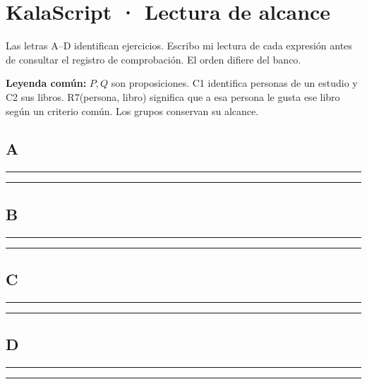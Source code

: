 \documentclass[11pt,a4paper]{article}
\begin{document}
\section*{KalaScript · Lectura de alcance}
Las letras A--D identifican ejercicios. Escribo mi lectura de cada expresión
antes de consultar el registro de comprobación. El orden difiere del banco.
\par\textbf{Leyenda común:} \(P,Q\) son proposiciones. C1 identifica personas
de un estudio y C2 sus libros. R7(persona, libro) significa que a esa persona le
gusta ese libro según un criterio común. Los grupos conservan su alcance.
\subsection*{A}
\vspace{8mm}\hrule\vspace{8mm}\hrule
\subsection*{B}
\vspace{8mm}\hrule\vspace{8mm}\hrule
\subsection*{C}
\vspace{8mm}\hrule\vspace{8mm}\hrule
\subsection*{D}
\vspace{8mm}\hrule\vspace{8mm}\hrule
\end{document}
